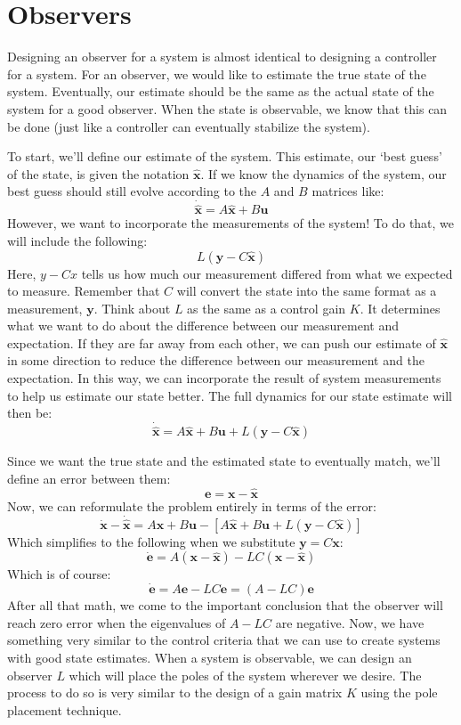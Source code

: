 \section{Observers}

Designing an observer for a system is almost identical to designing a controller for a system. For an observer, we would like to estimate the true state of the system. Eventually, our estimate should be the same as the actual state of the system for a good observer. When the state is observable, we know that this can be done (just like a controller can eventually stabilize the system).

To start, we'll define our estimate of the system. This estimate, our `best guess' of the state, is given the notation $\bm{\hat{x}}$. If we know the dynamics of the system, our best guess should still evolve according to the $A$ and $B$ matrices like:
$$\bm{\dot{\hat{x}}}=A\bm{\hat{x}}+B\bm{u}$$
However, we want to incorporate the measurements of the system! To do that, we will include the following:
$$L(\bm{y}-C\bm{\hat{x}})$$
Here, $y-C\hat{x}$ tells us how much our measurement differed from what we expected to measure. Remember that $C$ will convert the state into the same format as a measurement, $\bm{y}$. Think about $L$ as the same as a control gain $K$. It determines what we want to do about the difference between our measurement and expectation. If they are far away from each other, we can push our estimate of $\bm{\hat{x}}$ in some direction to reduce the difference between our measurement and the expectation. In this way, we can incorporate the result of system measurements to help us estimate our state better. The full dynamics for our state estimate will then be:
$$\bm{\dot{\hat{x}}}=A\bm{\hat{x}}+B\bm{u}+L(\bm{y}-C\bm{\hat{x}})$$

Since we want the true state and the estimated state to eventually match, we'll define an error between them:
$$\bm{e}=\bm{x}-\bm{\hat{x}}$$
Now, we can reformulate the problem entirely in terms of the error:
$$\bm{\dot{x}}-\bm{\dot{\hat{x}}}=A\bm{x}+B\bm{u}-[A\bm{\hat{x}}+B\bm{u}+L(\bm{y}-C\bm{\hat{x}})]$$
Which simplifies to the following when we substitute $\bm{y}=C\bm{x}$:
$$\bm{\dot{e}}=A(\bm{x}-\bm{\hat{x}})-LC(\bm{x}-\bm{\hat{x}})$$
Which is of course:
$$\bm{\dot{e}}=A\bm{e}-LC\bm{e}=(A-LC)\bm{e}$$
After all that math, we come to the important conclusion that the observer will reach zero error when the eigenvalues of $A-LC$ are negative. Now, we have something very similar to the control criteria that we can use to create systems with good state estimates. When a system is observable, we can design an observer $L$ which will place the poles of the system wherever we desire. The process to do so is very similar to the design of a gain matrix $K$ using the pole placement technique.

